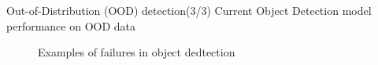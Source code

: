 \documentclass[10pt, aspectratio=169]{beamer}
\begin{document}
\begin{frame}{Out-of-Distribution (OOD) detection(3/3)}
    Current Object Detection model performance on OOD data
    \begin{figure}[!htbp]
        \centering
      \caption[Sample False Positive and False Negative detections]{Examples of failures in object dedtection}
      \label{fig:3}
    \end{figure}
\end{frame}
\end{document}
